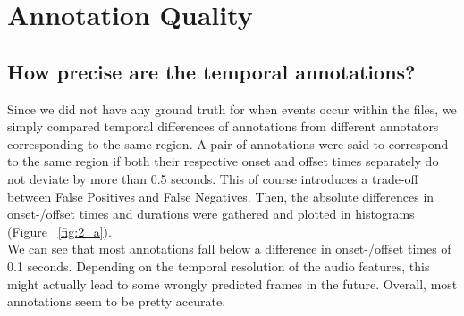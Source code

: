
\section{Annotation Quality} 
\label{sec:Annotation Quality}


\subsection{How precise are the temporal annotations?}
\label{sec:Annotation Quality:a1}
Since we did not have any ground truth for when events occur within the files, we simply compared temporal differences of annotations from different annotators corresponding to the same region. A pair of annotations were said to correspond to the same region if both their respective onset and offset times separately do not deviate by more than 0.5 seconds. This of course introduces a trade-off between False Positives and False Negatives.
Then, the absolute differences in onset-/offset times and durations were gathered and plotted in histograms (Figure ~\ref{fig:2_a}). \\
We can see that most annotations fall below a difference in onset-/offset times of 0.1 seconds. Depending on the temporal resolution of the audio features, this might actually lead to some wrongly predicted frames in the future. Overall, most annotations seem to be pretty accurate.

